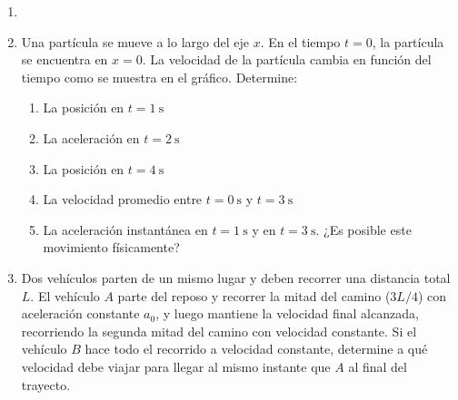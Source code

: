 \documentclass[letterpaper,11pt]{article}
\begin{document}
\vspace{-1cm}
\begin{enumerate}\setlength{\itemsep}{0.4cm}


\item[]

\item Una partícula se mueve a lo largo del eje $x$. En el tiempo $t=0$, la partícula se encuentra en $x=0$. La velocidad de la partícula cambia en función del tiempo como se muestra en el gráfico. Determine:

{
    \begin{multicols}{2}
        \begin{enumerate}
            
            \item La posición en $t=\SI{1}{\second}$
            
            \item La aceleración en $t=\SI{2}{\second}$
            
            \item La posición en $t=\SI{4}{\second}$
            
            \item La velocidad promedio entre $t=\SI{0}{\second}$ y $t=\SI{3}{\second}$
            
            \item La aceleración instantánea en $t=\SI{1}{\second}$ y en $t=\SI{3}{\second}$. ¿Es posible este movimiento físicamente?
        \end{enumerate}
        
        \columnbreak
        
        \begin{figure}[H]
            \centering
            
        \end{figure}
    \end{multicols}
}

\item Dos vehículos parten de un mismo lugar y deben recorrer una distancia total $L$. El vehículo $A$ parte del reposo y recorrer la mitad del camino ($3L/4$) con aceleración constante $a_0$, y luego mantiene la velocidad final alcanzada, recorriendo la segunda mitad del camino con velocidad constante. Si el vehículo $B$ hace todo el recorrido a velocidad constante, determine a qué velocidad debe viajar para llegar al mismo instante que $A$ al final del trayecto.


\end{enumerate}
\end{document}
